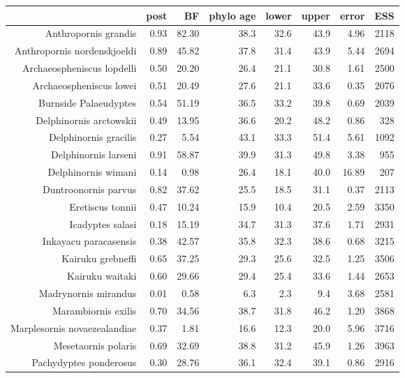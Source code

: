 \begin{table}[ht]
\centering
\begin{tabular}{rrrrrrrr}
  \hline
 & post & BF & phylo age & lower & upper & error & ESS \\ 
  \hline
Anthropornis grandis & 0.93 & 82.30 & 38.3 & 32.6 & 43.9 & 4.96 & 2118 \\ 
  Anthropornis nordenskjoeldi & 0.89 & 45.82 & 37.8 & 31.4 & 43.9 & 5.44 & 2694 \\ 
  Archaeospheniscus lopdelli & 0.50 & 20.20 & 26.4 & 21.1 & 30.8 & 1.61 & 2500 \\ 
  Archaeospheniscus lowei & 0.51 & 20.49 & 27.6 & 21.1 & 33.6 & 0.35 & 2076 \\ 
  Burnside Palaeudyptes & 0.54 & 51.19 & 36.5 & 33.2 & 39.8 & 0.69 & 2039 \\ 
  Delphinornis arctowskii & 0.49 & 13.95 & 36.6 & 20.2 & 48.2 & 0.86 & 328 \\ 
  Delphinornis gracilis & 0.27 & 5.54 & 43.1 & 33.3 & 51.4 & 5.61 & 1092 \\ 
  Delphinornis larseni & 0.91 & 58.87 & 39.9 & 31.3 & 49.8 & 3.38 & 955 \\ 
  Delphinornis wimani & 0.14 & 0.98 & 26.4 & 18.1 & 40.0 & 16.89 & 207 \\ 
  Duntroonornis parvus & 0.82 & 37.62 & 25.5 & 18.5 & 31.1 & 0.37 & 2113 \\ 
  Eretiscus tonnii & 0.47 & 10.24 & 15.9 & 10.4 & 20.5 & 2.59 & 3350 \\ 
  Icadyptes salasi & 0.18 & 15.19 & 34.7 & 31.3 & 37.6 & 1.71 & 2931 \\ 
  Inkayacu paracasensis & 0.38 & 42.57 & 35.8 & 32.3 & 38.6 & 0.68 & 3215 \\ 
  Kairuku grebneffi & 0.65 & 37.25 & 29.3 & 25.6 & 32.5 & 1.25 & 3506 \\ 
  Kairuku waitaki & 0.60 & 29.66 & 29.4 & 25.4 & 33.6 & 1.44 & 2653 \\ 
  Madrynornis mirandus & 0.01 & 0.58 & 6.3 & 2.3 & 9.4 & 3.68 & 2581 \\ 
  Marambiornis exilis & 0.70 & 34.56 & 38.7 & 31.8 & 46.2 & 1.20 & 3868 \\ 
  Marplesornis novaezealandiae & 0.37 & 1.81 & 16.6 & 12.3 & 20.0 & 5.96 & 3716 \\ 
  Mesetaornis polaris & 0.69 & 32.69 & 38.8 & 31.2 & 45.9 & 1.26 & 3963 \\ 
  Pachydyptes ponderosus & 0.30 & 28.76 & 36.1 & 32.4 & 39.1 & 0.86 & 2916 \\ 

\end{tabular}
\end{table}
